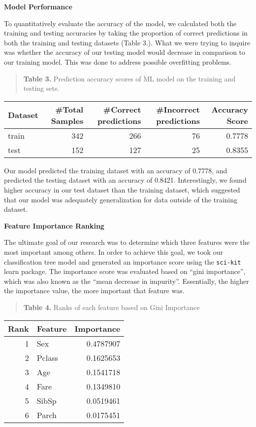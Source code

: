 \documentclass[]{article}
\begin{document}
\newpage

\textbf{Model Performance}

To quantitatively evaluate the accuracy of the model, we calculated both
the training and testing accuracies by taking the proportion of correct
predictions in both the training and testing datasets (Table 3.). What
we were trying to inquire was whether the accuracy of our testing model
would decrease in comparison to our training model. This was done to
address possible overfitting problems.

\begin{quote}
\textbf{Table 3.} Prediction accuracy scores of ML model on the training
and testing sets.
\end{quote}

\begin{longtable}[]{@{}lrrrr@{}}
\toprule
Dataset & \#Total Samples & \#Correct predictions & \#Incorrect
predictions & Accuracy Score\tabularnewline
\midrule
\endhead
train & 342 & 266 & 76 & 0.7778\tabularnewline
test & 152 & 127 & 25 & 0.8355\tabularnewline
\bottomrule
\end{longtable}

Our model predicted the training dataset with an accuracy of 0.7778, and
predicted the testing dataset with an accuracy of 0.8421. Interestingly,
we found higher accuracy in our test dataset than the training dataset,
which suggested that our model was adequately generalization for data
outside of the training dataset.

\textbf{Feature Importance Ranking}

The ultimate goal of our research was to determine which three features
were the most important among others. In order to achieve this goal, we
took our classification tree model and generated an importance score
using the \texttt{sci-kit} learn package. The importance score was
evaluated based on ``gini importance'', which was also known as the
``mean decrease in impurity''. Essentially, the higher the importance
value, the more important that feature was.

\begin{quote}
\textbf{Table 4.} Ranks of each feature based on Gini Importance
\end{quote}

\begin{longtable}[]{@{}rlr@{}}
\toprule
Rank & Feature & Importance\tabularnewline
\midrule
\endhead
1 & Sex & 0.4787907\tabularnewline
2 & Pclass & 0.1625653\tabularnewline
3 & Age & 0.1541718\tabularnewline
4 & Fare & 0.1349810\tabularnewline
5 & SibSp & 0.0519461\tabularnewline
6 & Parch & 0.0175451\tabularnewline
\bottomrule
\end{longtable}
\end{document}
